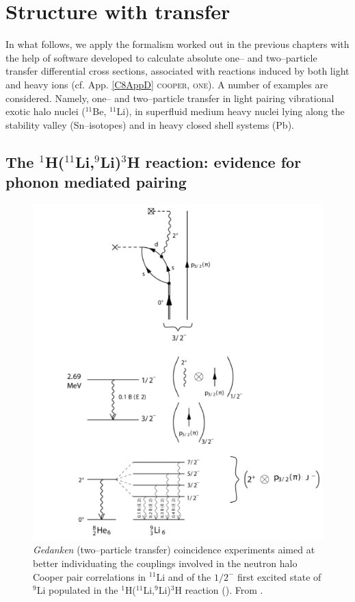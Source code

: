  \chapter[Structure with two neutrons]{Structure with transfer}\label{C8}
 In what follows, we apply the formalism worked out in the previous chapters with the help of software developed to calculate absolute one-- and two--particle transfer differential cross sections, associated with reactions induced by both light and heavy ions (cf. App. \ref{C8AppD} \textsc{cooper}, \textsc{one}).
 A number of examples are considered. Namely, one-- and two--particle transfer in light pairing vibrational exotic halo nuclei  ($^{11}$Be, $^{11}$Li), in superfluid medium heavy nuclei lying along the stability valley (Sn--isotopes) and in heavy closed shell  systems (Pb).
 \section[Evidence for phonon mediated pairing]{The $^1$H($^{11}$Li,$^9$Li)$^3$H reaction: evidence for phonon mediated pairing}\label{C8S1}
    \begin{figure}
    \centerline{\includegraphics*[width=16cm,angle=0]{C8/figsC8/fig8_1_3x}}
    	\caption{\emph{Gedanken} (two--particle transfer) coincidence experiments aimed at better individuating the couplings involved in the neutron halo Cooper pair correlations in $^{11}$Li and of the $1/2^-$ first excited state of $^9$Li populated in the  
    	 $^1$H($^{11}$Li,$^9$Li)$^3$H  reaction (\cite{Tanihata:08,Barranco:01,Potel:10}). From \cite{Potel:14}.}\label{fig8_1_3}
    \end{figure}
